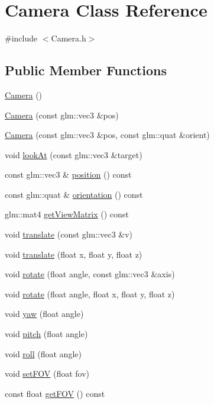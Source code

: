 \hypertarget{class_camera}{}\section{Camera Class Reference}
\label{class_camera}


{\ttfamily \#include $<$Camera.\+h$>$}

\subsection*{Public Member Functions}
\begin{DoxyCompactItemize}
\item 
\mbox{\hyperlink{class_camera_a01f94c3543f56ede7af49dc778f19331}{Camera}} ()
\item 
\mbox{\hyperlink{class_camera_acee2a1b3d56b0f141a3c6ee82735ed39}{Camera}} (const glm\+::vec3 \&pos)
\item 
\mbox{\hyperlink{class_camera_a9e5dda23dca2ae363424f7a9025f55c9}{Camera}} (const glm\+::vec3 \&pos, const glm\+::quat \&orient)
\item 
void \mbox{\hyperlink{class_camera_aec0442093303b9568a159f8c87f8b7d8}{look\+At}} (const glm\+::vec3 \&target)
\item 
const glm\+::vec3 \& \mbox{\hyperlink{class_camera_a26f5c28317ec7add2a21ddbdc8e463fb}{position}} () const
\item 
const glm\+::quat \& \mbox{\hyperlink{class_camera_a872dd113215278493380d19716c63644}{orientation}} () const
\item 
glm\+::mat4 \mbox{\hyperlink{class_camera_a2f90e661a78172675ca06ea69667b531}{get\+View\+Matrix}} () const
\item 
void \mbox{\hyperlink{class_camera_aa00429d00bae4984467f9c5d1a3bd158}{translate}} (const glm\+::vec3 \&v)
\item 
void \mbox{\hyperlink{class_camera_ac9e53556c53beee69c77a97e2a1c1068}{translate}} (float x, float y, float z)
\item 
void \mbox{\hyperlink{class_camera_a0e6180b5a8da63a999db3de1802c8f4c}{rotate}} (float angle, const glm\+::vec3 \&axis)
\item 
void \mbox{\hyperlink{class_camera_a4a45040f06f24a53af7f17bbcc610f22}{rotate}} (float angle, float x, float y, float z)
\item 
void \mbox{\hyperlink{class_camera_ab4eab94754431725c572d528a07a35cc}{yaw}} (float angle)
\item 
void \mbox{\hyperlink{class_camera_a49e00b90b94853e4485a6bdf063796de}{pitch}} (float angle)
\item 
void \mbox{\hyperlink{class_camera_a72be99f88b1cc21122178109d3441818}{roll}} (float angle)
\item 
void \mbox{\hyperlink{class_camera_ade53ee61895c2143da3cec03d08ef3eb}{set\+F\+OV}} (float fov)
\item 
const float \mbox{\hyperlink{class_camera_ab16a5e8f683ee2d598578a2d9836a24a}{get\+F\+OV}} () const
\end{DoxyCompactItemize}
